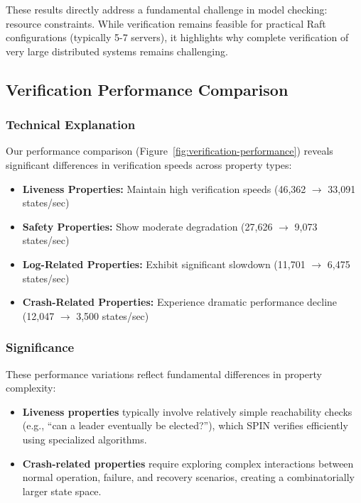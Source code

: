 These results directly address a fundamental challenge in model checking: resource constraints. While verification remains feasible for practical Raft configurations (typically 5-7 servers), it highlights why complete verification of very large distributed systems remains challenging.

\subsection{Verification Performance Comparison}

\subsubsection{Technical Explanation}

Our performance comparison (Figure~\ref{fig:verification-performance}) reveals significant differences in verification speeds across property types:

\begin{itemize}
    \item \textbf{Liveness Properties:} Maintain high verification speeds (46,362 $\rightarrow$ 33,091 states/sec)
    \item \textbf{Safety Properties:} Show moderate degradation (27,626 $\rightarrow$ 9,073 states/sec)
    \item \textbf{Log-Related Properties:} Exhibit significant slowdown (11,701 $\rightarrow$ 6,475 states/sec)
    \item \textbf{Crash-Related Properties:} Experience dramatic performance decline (12,047 $\rightarrow$ 3,500 states/sec)
\end{itemize}

\subsubsection{Significance}

These performance variations reflect fundamental differences in property complexity:

\begin{itemize}
    \item \textbf{Liveness properties} typically involve relatively simple reachability checks (e.g., ``can a leader eventually be elected?''), which SPIN verifies efficiently using specialized algorithms.
    
    \item \textbf{Crash-related properties} require exploring complex interactions between normal operation, failure, and recovery scenarios, creating a combinatorially larger state space.
\end{itemize}

